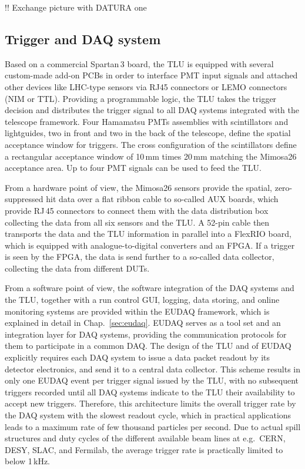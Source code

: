 !! Exchange picture with DATURA one

\subsection{Trigger and DAQ system}

Based on a commercial Spartan\,3 board, the TLU is equipped with several custom-made add-on PCBs in order to interface PMT input signals
 and attached other devices like LHC-type sensors via RJ45 connectors or LEMO connectors (NIM or TTL). 
Providing a programmable logic, the TLU  takes the trigger decision and distributes the trigger signal to all DAQ systems integrated with the telescope framework.
Four Hamamatsu PMTs assemblies with scintillators and lightguides, two in front and two in the back of the telescope, define the spatial acceptance window for triggers. 
The cross configuration of the scintillators define a rectangular acceptance window of 10\,mm times 20\,mm matching the Mimosa26 acceptance area. 
Up to four PMT signals can be used to feed the TLU. 

From a hardware point of view, the Mimosa26 sensors provide the spatial, zero-suppressed hit data over a flat ribbon cable to so-called AUX boards, which provide RJ\,45 connectors to connect them with the
 data distribution box collecting the data from all six sensors and the TLU. 
A 52-pin cable then transports the data and the TLU information in parallel into a FlexRIO board, which is equipped with analogue-to-digital converters and an FPGA. 
If a trigger is seen by the FPGA, the data is send further to a so-called data collector, collecting the data from different DUTs. 

From a software point of view, the software integration of the DAQ systems and the TLU, together with a run control GUI, logging, data storing, and online monitoring systems are provided within the EUDAQ framework,
 which is explained in detail in Chap.~\ref{sec:eudaq}. 
EUDAQ serves as a tool set and an integration layer for DAQ systems, providing the communication protocols for them to participate in a common DAQ. 
The design of the TLU and of EUDAQ explicitly requires each DAQ system to issue a data packet readout by its detector electronics, and send it to a central data collector. 
This scheme results in only one EUDAQ event per trigger signal issued by the TLU, with no subsequent triggers recorded until all DAQ systems indicate to the TLU their availability to accept new triggers.
Therefore, this architecture limits the overall trigger rate by the DAQ system with the slowest readout cycle, which in practical applications leads to a maximum rate of few thousand particles per second. 
Due to actual spill structures and duty cycles of the different available beam lines at e.g.~CERN, DESY, SLAC, and Fermilab, the average trigger rate is practically limited to below 1\,kHz. 


